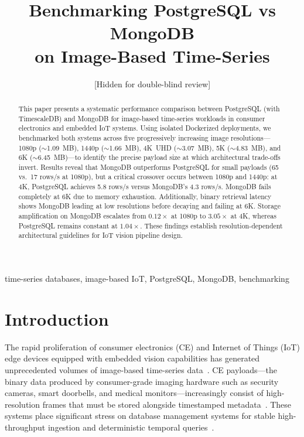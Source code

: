 \documentclass[conference]{IEEEtran}
\begin{document}
\title{Benchmarking PostgreSQL vs MongoDB\\on Image-Based Time-Series\\
}

\author{
[Hidden for double-blind review]
}


\maketitle

\begin{abstract}
This paper presents a systematic performance comparison between PostgreSQL (with TimescaleDB) and MongoDB for image-based time-series workloads in consumer electronics and embedded IoT systems. Using isolated Dockerized deployments, we benchmarked both systems across five progressively increasing image resolutions---1080p ($\sim$1.09~MB), 1440p ($\sim$1.66~MB), 4K~UHD ($\sim$3.07~MB), 5K ($\sim$4.83~MB), and 6K ($\sim$6.45~MB)---to identify the precise payload size at which architectural trade-offs invert. Results reveal that MongoDB outperforms PostgreSQL for small payloads (65 vs.\ 17 rows/s at 1080p), but a critical crossover occurs between 1080p and 1440p: at 4K, PostgreSQL achieves 5.8 rows/s versus MongoDB's 4.3 rows/s. MongoDB fails completely at 6K due to memory exhaustion. Additionally, binary retrieval latency shows MongoDB leading at low resolutions before decaying and failing at 6K. Storage amplification on MongoDB escalates from $0.12\times$ at 1080p to $3.05\times$ at 4K, whereas PostgreSQL remains constant at $1.04\times$. These findings establish resolution-dependent architectural guidelines for IoT vision pipeline design.
\end{abstract}

\begin{IEEEkeywords}
time-series databases, image-based IoT, PostgreSQL, MongoDB, benchmarking
\end{IEEEkeywords}

\section{Introduction}
\label{sec:introduction} 

The rapid proliferation of consumer electronics (CE) and Internet of Things (IoT) edge devices equipped with embedded vision capabilities has generated unprecedented volumes of image-based time-series data~\cite{ieee_ce_definition}. CE payloads---the binary data produced by consumer-grade imaging hardware such as security cameras, smart doorbells, and medical monitors---increasingly consist of high-resolution frames that must be stored alongside timestamped metadata~\cite{intuz_iot_databases,ceec_tsdb_review}. These systems place significant stress on database management systems for stable high-throughput ingestion and deterministic temporal queries~\cite{jensen_tsms_survey,nerc_tsdb_survey}.
\end{document}
